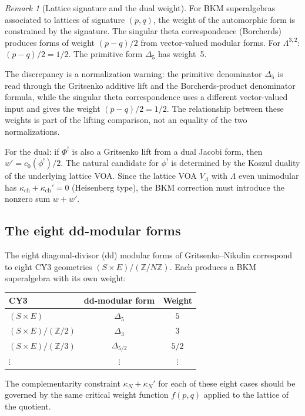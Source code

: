 \documentclass[11pt]{article}
\theoremstyle{definition}
\theoremstyle{remark}
\newtheorem{remark}[theorem]{Remark}
\begin{document}
\begin{remark}[Lattice signature and the dual weight]
For BKM superalgebras associated to lattices of signature $(p,q)$, the
weight of the automorphic form is constrained by the signature. The
singular theta correspondence (Borcherds) produces forms of weight
$(p - q)/2$ from vector-valued modular forms. For $\Lambda^{3,2}$:
$(p-q)/2 = 1/2$. The primitive form $\Delta_5$ has weight~5.

The discrepancy is a normalization warning: the primitive denominator
$\Delta_5$ is read through the Gritsenko additive lift and the
Borcherds-product denominator formula, while the singular theta
correspondence uses a different vector-valued input and gives the
weight $(p-q)/2 = 1/2$. The relationship between these weights is part
of the lifting comparison, not an equality of the two normalizations.

For the dual: if $\Phi^!$ is also a Gritsenko lift from a dual Jacobi
form, then $w' = c_0(\phi^!)/2$. The natural candidate for $\phi^!$ is
determined by the Koszul duality of the underlying lattice VOA. Since
the lattice VOA $V_\Lambda$ with $\Lambda$ even unimodular has
$\kappa_{\mathrm{ch}} + \kappa_{\mathrm{ch}}' = 0$ (Heisenberg type), the BKM correction must
introduce the nonzero sum $w + w'$.
\end{remark}

\subsection{The eight dd-modular forms}

The eight diagonal-divisor (dd) modular forms of Gritsenko--Nikulin
correspond to eight CY3 geometries $(S \times E)/(\mathbb{Z}/N\mathbb{Z})$.
Each produces a BKM superalgebra with its own weight:
\begin{center}
\begin{tabular}{lcc}
\textbf{CY3} & \textbf{dd-modular form} & \textbf{Weight} \\ \hline
$(S \times E)$ & $\Delta_5$ & $5$ \\
$(S \times E)/(\mathbb{Z}/2)$ & $\Delta_3$ & $3$ \\
$(S \times E)/(\mathbb{Z}/3)$ & $\Delta_{5/2}$ & $5/2$ \\
$\vdots$ & $\vdots$ & $\vdots$
\end{tabular}
\end{center}
The complementarity constraint $\kappa_N + \kappa_N'$ for each of these
eight cases should be governed by the same critical weight function
$f(p,q)$ applied to the lattice of the quotient.
\end{document}
